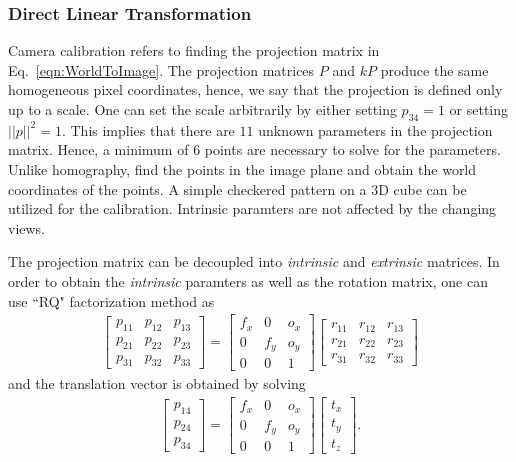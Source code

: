 \documentclass{report}
\begin{document}
\subsubsection{Direct Linear Transformation}
\hspace{\parindent}Camera calibration refers to finding the projection matrix in Eq.~\ref{eqn:WorldToImage}. The projection matrices $P$ and $kP$ produce the same homogeneous pixel coordinates, hence, we say that the projection is defined only up to a scale. One can set the scale arbitrarily by either setting $p_{34} = 1$ or setting $||p||^2 = 1$. This implies that there are $11$ unknown parameters in the projection matrix. Hence, a minimum of $6$ points are necessary to solve for the parameters. Unlike homography, find the points in the image plane and obtain the world coordinates of the points. A simple checkered pattern on a $3$D cube can be utilized for the calibration. Intrinsic paramters are not affected by the changing views.

The projection matrix can be decoupled into \textit{intrinsic} and \textit{extrinsic} matrices. In order to obtain the \textit{intrinsic} paramters as well as the rotation matrix, one can use ``RQ" factorization method as
\begin{align}
	\begin{bmatrix}
		p_{11} & p_{12} & p_{13} \\
		p_{21} & p_{22} & p_{23} \\
		p_{31} & p_{32} & p_{33}
	\end{bmatrix}
	=
	\begin{bmatrix}
		f_x & 0 & o_x \\
		0 & f_y & o_y \\
		0 & 0 & 1
	\end{bmatrix}
	\begin{bmatrix}
		r_{11} & r_{12} & r_{13} \\
		r_{21} & r_{22} & r_{23} \\
		r_{31} & r_{32} & r_{33}
	\end{bmatrix}
	\label{eqn:IntrinsicRotationDecoupled}
\end{align}
and the translation vector is obtained by solving
\begin{align}
	\begin{bmatrix}
		p_{14} \\
		p_{24} \\
		p_{34}
	\end{bmatrix}
	=
	\begin{bmatrix}
		f_x & 0 & o_x \\
		0 & f_y & o_y \\
		0 & 0 & 1
	\end{bmatrix}
	\begin{bmatrix}
		t_x \\
		t_y \\
		t_z
	\end{bmatrix}.
	\label{eqn:TranslationDecoupled}
\end{align}
\end{document}
